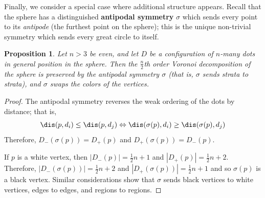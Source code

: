 \documentclass[11pt,oneside]{amsart}
\newtheorem{prop}[thm]{Proposition}
\theoremstyle{definition}
\theoremstyle{remark}
\newenvironment{rem}{\refstepcounter{thm}\begin{proof}[Remark \emph{\thethm}]\renewcommand*{\qedsymbol}{\(\blacksquare\)}}{\end{proof}}
\numberwithin{equation}{section}
\begin{document}

Finally, we consider a special case where additional structure appears. Recall that the sphere has a distinguished \textbf{antipodal symmetry}  $\sigma$ which sends every point to its \emph{antipode} (the furthest point on the sphere); this is the unique non-trivial symmetry which sends every great circle to itself.

\begin{prop}\label{prop: antipodal}
Let $n>3$ be even, and let $D$ be a configuration of $n$-many dots in general position in the sphere. Then the $\frac{n}{2}$th order Voronoi decomposition of the sphere is preserved by the antipodal symmetry $\sigma$ (that is, $\sigma$ sends strata to strata), and $\sigma$ swaps the colors of the vertices.
\end{prop}

\begin{proof}
%
The antipodal symmetry reverses the weak ordering of the dots by distance; that is,
\[
\dis(p,d_i) \leq \dis( p,d_j) \Leftrightarrow \dis(\sigma(p) , d_i) \geq \dis(\sigma(p),d_j)
\]
Therefore, $D_-(\sigma(p)) = D_+(p)$ and $D_+(\sigma(p)) = D_-(p)$.

If $p$ is a white vertex, then $|D_-(p)|=\frac{1}{2}n+1$ and $|D_+(p)|=\frac{1}{2}n+2$. Therefore, $|D_-(\sigma(p))|=\frac{1}{2}n+2$ and $|D_+(\sigma(p))|=\frac{1}{2}n+1$ and so $\sigma(p)$ is a black vertex. Similar considerations show that $\sigma$ sends black vertices to white vertices, edges to edges, and regions to regions.
%
\end{proof}
\end{document}
